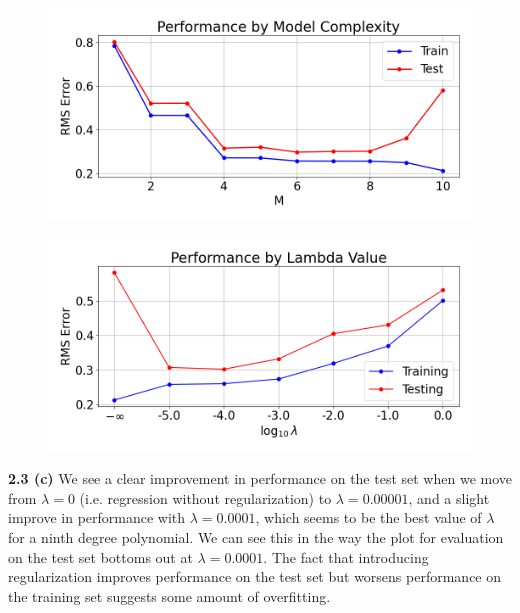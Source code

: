 \documentclass[12 pt]{article}        	%
\begin{document}
\begin{figure}[h!]
    \includegraphics[scale=0.5]{rms_model_size.png}
\end{figure}
\begin{figure}[h!]
    \includegraphics[scale=0.5]{rms_lambda_value.png}
\end{figure}

\textbf{2.3 (c)}
  We see a clear improvement in performance on the test set when we move from $ \lambda = 0 $ (i.e. regression without regularization) 
  to $ \lambda = 0.00001 $, and a slight improve in performance with $ \lambda = 0.0001 $, which seems to be the best value of $ \lambda $ 
  for a ninth degree polynomial.
  We can see this in the way the plot for evaluation on the test set bottoms out at $ \lambda = 0.0001 $. The fact that introducing regularization
  improves performance on the test set but worsens performance on the training set suggests some amount of overfitting.
\end{document}
